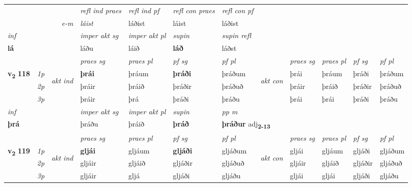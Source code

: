 \begin{longtable}[l]{X>{\footnotesize\itshape}llXXXXlXXXX}
 & && \textit{refl ind praes} & \textit{refl ind pf} & \textit{refl con praes} & \textit{refl con pf} \\*
\multicolumn{3}{r}{\textit{e-m}}& láist & láðist & láist & láðist \\*

\cmidrule{4-7}
   {\textit{inf}} & &  & \textit{imper akt sg} & \textit{imper akt pl}    & \textit{supin} & \textit{supin refl}  \\*
  {\textbf{lá}} & && láðu  & láið    &  \textbf{láð} & láðst  \\*

\midrule

 & &   & \textit{praes sg}  & \textit{praes pl}    & \textit{ pf sg} & \textit{pf pl} & & \textit{praes sg}  & \textit{praes pl}    & \textit{pf sg} & \textit{pf pl }  \\ \cmidrule{4-7} \cmidrule{9-12}
 \multirow{2}{*}{{{\textbf{v{\textsubscript{2}}} \Large{\textbf{118}}}}}  & 1p & \multirow{3}{*}{\begin{turn}{90}\textit{akt ind}\end{turn}} & \textbf{þrái} & þráum & \textbf{þráði} & þráðum & \multirow{3}{*}{\begin{turn}{90}\textit{akt con}\end{turn}} &þrái & þráum & þráði & þráðum\\*
 & 2p &  &  þráir  & þráið & þráðir & þráðuð & & þráir & þráið & þráðir & þráðuð \\*
 & 3p &  & þráir & þrá & þráði & þráðu & & þrái & þrái& þráði & þráðu \\*
\cmidrule{4-7} \cmidrule{9-12}

   {\textit{inf}} & &  & \textit{imper akt sg} & \textit{imper akt pl}    & \textit{supin}  & \textit{pp m} \\*
  {\textbf{þrá}} & && þráðu  & þráið    &  \textbf{þráð}  & \multicolumn{2}{l}{\textbf{þráður} adj\textbf{\textsubscript{2-13}}} \\*

\midrule

 & &   & \textit{praes sg}  & \textit{praes pl}    & \textit{ pf sg} & \textit{pf pl} & & \textit{praes sg}  & \textit{praes pl}    & \textit{pf sg} & \textit{pf pl }  \\ \cmidrule{4-7} \cmidrule{9-12}
 \multirow{2}{*}{{{\textbf{v{\textsubscript{2}}} \Large{\textbf{119}}}}}  & 1p & \multirow{3}{*}{\begin{turn}{90}\textit{akt ind}\end{turn}} & \textbf{gljái} & gljáum & \textbf{gljáði} & gljáðum & \multirow{3}{*}{\begin{turn}{90}\textit{akt con}\end{turn}} &gljái & gljáum & gljáði & gljáðum\\*
 & 2p &  &  gljáir  & gljáið & gljáðir & gljáðuð & & gljáir & gljáið & gljáðir & gljáðuð \\*
 & 3p &  & gljáir & gljá & gljáði & gljáðu & & gljái & gljái& gljáði & gljáðu \\*
\cmidrule{4-7} \cmidrule{9-12}


\end{longtable}
